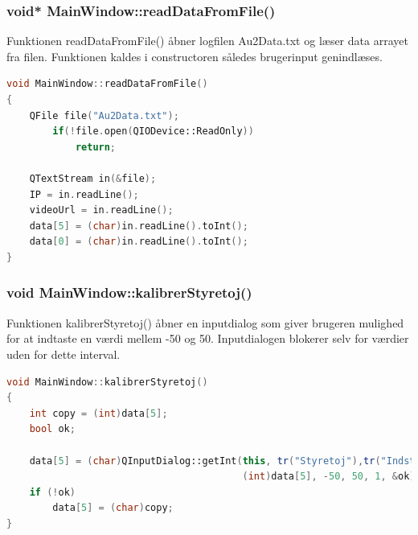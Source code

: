 \subsubsection{void* MainWindow::readDataFromFile()}
Funktionen readDataFromFile() åbner logfilen Au2Data.txt og læser data arrayet fra filen. Funktionen kaldes i constructoren således brugerinput genindlæses. 
\begin{lstlisting}[caption={readDataFromFile},label=lst:readDataFromFile, language=c++]
void MainWindow::readDataFromFile()
{
    QFile file("Au2Data.txt");
        if(!file.open(QIODevice::ReadOnly))
            return;

    QTextStream in(&file);
    IP = in.readLine();
    videoUrl = in.readLine();
    data[5] = (char)in.readLine().toInt();
    data[0] = (char)in.readLine().toInt();
}
\end{lstlisting}

\subsubsection{void MainWindow::kalibrerStyretoj()}
Funktionen kalibrerStyretoj() åbner en inputdialog som giver brugeren mulighed for at indtaste en værdi mellem -50 og 50. Inputdialogen blokerer selv for værdier uden for dette interval.
\begin{lstlisting}[caption={kalibrerStyretoj},label=lst:kalibrerStyretoj, language=c++]
void MainWindow::kalibrerStyretoj()
{
    int copy = (int)data[5];
    bool ok;

    data[5] = (char)QInputDialog::getInt(this, tr("Styretoj"),tr("Indstil styretoj"),
                                         (int)data[5], -50, 50, 1, &ok);
    if (!ok)
        data[5] = (char)copy;
}
\end{lstlisting}

